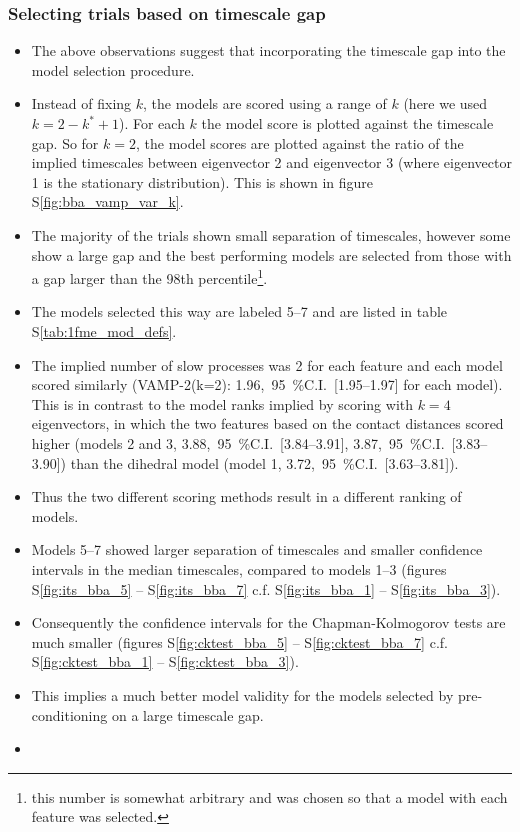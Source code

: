 \documentclass[journal=jacsat,manuscript=article]{achemso}
\newcommand{\numci}[3]{\num{#1},\ \SI{95}{\percent}C.I.\ [\numrange[range-phrase=---]{#2}{#3}]}
\newcommand*\sref[1]{%
    S\ref{#1}}
\begin{document}
\subsubsection{Selecting trials based on timescale gap}

\begin{itemize}
    \item The above observations suggest that incorporating the timescale gap into the model selection procedure. 
    \item Instead of fixing $k$, the models are scored using a range of $k$ (here we used $k=2-k^{*}+1$). For each $k$ the model score is plotted against the timescale gap. So for $k=2$, the model scores are plotted against the ratio of the implied timescales between eigenvector 2 and eigenvector 3 (where eigenvector 1 is the stationary distribution).  This is shown in figure \sref{fig:bba_vamp_var_k}.  
    \item The majority of the trials shown small separation of timescales, however some show a large gap and the best performing models are selected from those with a gap larger than the 98th percentile\footnote{this number is somewhat arbitrary and was chosen so that a model with each feature was selected.}. 
    \item The models selected this way are labeled \numrange{5}{7} and are listed in table \sref{tab:1fme_mod_defs}.  
    \item The implied number of slow processes was \num{2} for each feature and each model scored similarly (VAMP-2(k=2): \numci{1.96}{1.95}{1.97} for each model). This is in contrast to the model ranks implied by scoring with $k=4$ eigenvectors, in which the two features based on the contact distances  scored higher (models 2 and 3, \numci{3.88}{3.84}{3.91}, \numci{3.87}{3.83}{3.90}) than the dihedral model (model 1, \numci{3.72}{3.63}{3.81}). 
    \item Thus the two different scoring methods result in a different ranking of models.  
    \item Models \numrange{5}{7} showed larger separation of timescales and smaller confidence intervals in the median timescales, compared to models \numrange{1}{3} (figures \sref{fig:its_bba_5} -- \sref{fig:its_bba_7} c.f. \sref{fig:its_bba_1} -- \sref{fig:its_bba_3}). 
    \item Consequently the confidence intervals for the Chapman-Kolmogorov tests are much smaller (figures \sref{fig:cktest_bba_5} -- \sref{fig:cktest_bba_7} c.f. \sref{fig:cktest_bba_1} -- \sref{fig:cktest_bba_3}).  
    \item This implies a much better model validity for the models selected by pre-conditioning on a large timescale gap. 
    \item 
\end{itemize}
\end{document}

